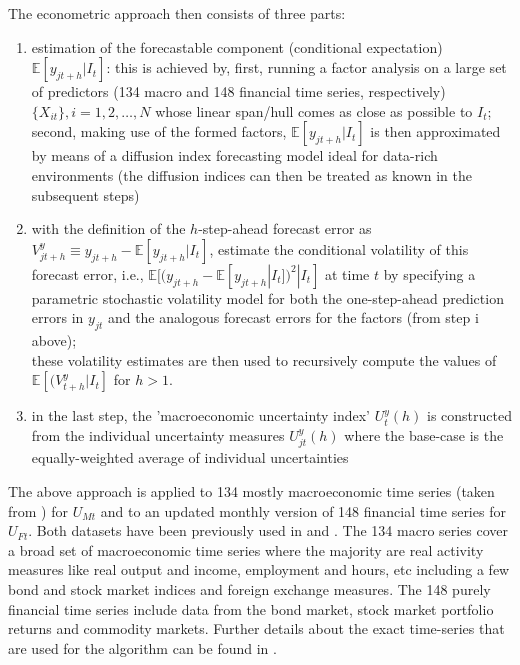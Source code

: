 \documentclass[a4paper,11pt,listof=nochaptergap,oneside,pointednumbers,bibtotoc,bigheadings,liststotoc,hidelinks]{scrbook}
\theoremstyle{mysatz}
\theoremstyle{mydefinition}
\theoremstyle{mytheorem}
\theoremstyle{mybemerkung}
\begin{document}
The econometric approach then consists of three parts:
\begin{enumerate}[i]
	\item estimation of the forecastable component (conditional expectation) $\mathbb{E}[y_{jt+h}|I_t]$: this is achieved by, first, running a factor analysis on a large set of predictors (134 macro and 148 financial time series, respectively) $\{X_{it}\}, i = 1, 2, \dots, N$ whose linear span/hull comes as close as possible to $I_t$; second, making use of the formed factors, $\mathbb{E}[y_{jt+h}|I_t]$ is then approximated by means of a diffusion index forecasting model ideal for data-rich environments (the diffusion indices can then be treated as known in the subsequent steps)
	\item with the definition of the $h$-step-ahead forecast error as $V_{jt+h}^y \equiv y_{jt+h} - \mathbb{E}[y_{jt+h}|I_t]$, \citet{juradoetal:15} estimate the conditional volatility of this forecast error, i.e., $\mathbb{E}[(y_{jt+h} - \mathbb{E}[y_{jt+h}|I_t])^2|I_t]$ at time $t$ by specifying a parametric stochastic volatility model for both the one-step-ahead prediction errors in $y_{jt}$ and the analogous forecast errors for the factors (from step i above); \\
	these volatility estimates are then used to recursively compute the values of $\mathbb{E}[(V_{t+h}^y|I_t]$ for $h > 1$. 
	\item in the last step, the 'macroeconomic uncertainty index' $U_t^y(h)$ is constructed from the individual uncertainty measures $U_{jt}^y(h)$ where the base-case is the equally-weighted average of individual uncertainties
\end{enumerate}

The above approach is applied to 134 mostly macroeconomic time series (taken from \citealp{mccrackenandng:16}) for $U_{Mt}$ and to an updated monthly version of 148 financial time series for $U_{Ft}$. Both datasets have been previously used in \citet{ludvigsonandng:07} and \citet{juradoetal:15}. The 134 macro series cover a broad set of macroeconomic time series where the majority are real activity measures like real output and income, employment and hours, etc including a few bond and stock market indices and foreign exchange measures. The 148 purely financial time series  include data from the bond market, stock market portfolio returns and commodity markets. Further details about the exact time-series that are used for the algorithm can be found in \citet{ludvigsonetal:19}.
\end{document}
